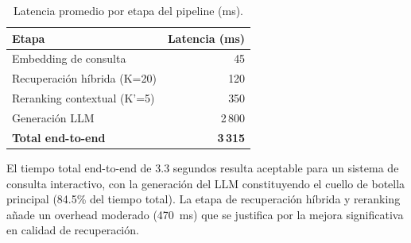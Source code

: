 \begin{table}[!t]
\centering
\caption{Latencia promedio por etapa del pipeline (ms).}
\label{tab:latency}
\renewcommand{\arraystretch}{1.2}
\footnotesize
\begin{tabular}{l r}
\toprule
\textbf{Etapa} & \textbf{Latencia (ms)} \\
\midrule
Embedding de consulta        & 45 \\
Recuperación híbrida (K=20)  & 120 \\
Reranking contextual (K'=5)  & 350 \\
Generación LLM               & 2\,800 \\
\midrule
\textbf{Total end-to-end}    & \textbf{3\,315} \\
\bottomrule
\end{tabular}
\end{table}

El tiempo total end-to-end de 3.3 segundos resulta aceptable para un sistema de consulta interactivo, con la generación del LLM constituyendo el cuello de botella principal (84.5\% del tiempo total). La etapa de recuperación híbrida y reranking añade un overhead moderado (470~ms) que se justifica por la mejora significativa en calidad de recuperación.
